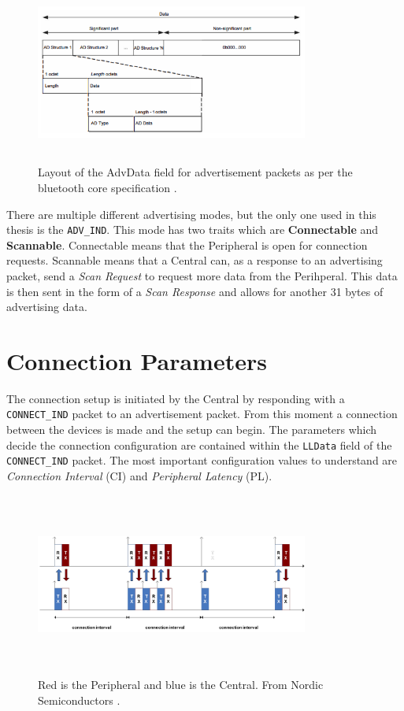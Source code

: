 \begin{figure}[]
    \centering
    \includegraphics[width=0.8\textwidth,height=6cm,keepaspectratio=true]{images/advertising_data}
    \caption{
        Layout of the AdvData field for advertisement packets as per the bluetooth core specification \cite{bluetooth_spec}.
    }
    \label{fig:advdata_layout}
\end{figure}

There are multiple different advertising modes, but the only one used in this thesis is the \texttt{ADV\_IND}. This mode has two traits which are \textbf{Connectable} and \textbf{Scannable}. Connectable means that the Peripheral is open for connection requests. Scannable means that a Central can, as a response to an advertising packet, send a \textit{Scan Request} to request more data from the Perihperal. This data is then sent in the form of a \textit{Scan Response} and allows for another 31 bytes of advertising data.

\section{Connection Parameters}
The connection setup is initiated by the Central by responding with a \texttt{CONNECT\_IND} packet to an advertisement packet. From this moment a connection between the devices is made and the setup can begin. The parameters which decide the connection configuration are contained within the \texttt{LLData} field of the \texttt{CONNECT\_IND} packet. The most important configuration values to understand are \textit{Connection Interval} (CI) and \textit{Peripheral Latency} (PL). 

\begin{figure}[]
    \centering
    \includegraphics[width=0.8\textwidth,height=6cm,keepaspectratio=true]{images/connection_interval_slave_latency}
    \caption{
        \color{red} Red \color{black} is the Peripheral and \color{blue} blue \color{black} is the Central. From Nordic Semiconductors \cite{nordic_2022}.
    }
    \label{fig:ci_and_pl}
\end{figure}

